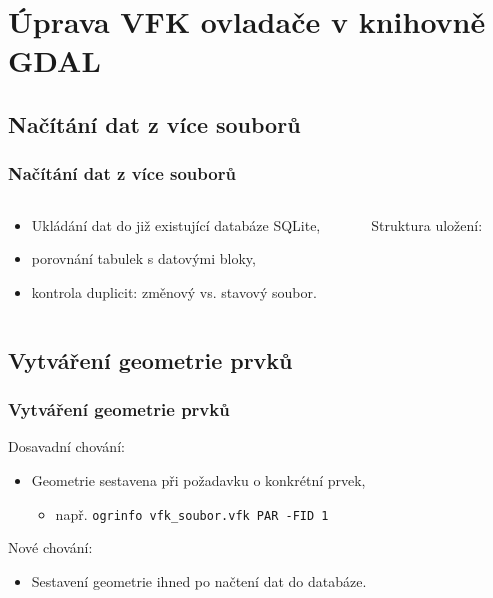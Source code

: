 \documentclass{beamer}
\begin{document}

\section{Úprava VFK ovladače v knihovně GDAL}

\subsection{Načítání dat z více souborů}

\begin{frame}
\frametitle{Načítání dat z více souborů}

\begin{columns}%
  \begin{column}{0.5\textwidth}
  
    \begin{itemize}
     \item Ukládání dat do již existující databáze SQLite,
     \item porovnání tabulek s datovými bloky,
     \item kontrola duplicit: změnový vs. stavový soubor.
    \end{itemize}
    
  \end{column}
  
  \begin{column}{0.4\textwidth}
  Struktura uložení:
  \end{column}

\end{columns}
  
\end{frame}


\subsection{Vytváření geometrie prvků}

\begin{frame}
\frametitle{Vytváření geometrie prvků}

Dosavadní chování:
\begin{itemize}
 \item Geometrie sestavena při požadavku o konkrétní prvek,
  \begin{itemize}
   \item např. \texttt{ogrinfo vfk\_soubor.vfk PAR -FID 1}
  \end{itemize}
\end{itemize}

Nové chování:
\begin{itemize}
 \item Sestavení geometrie ihned po načtení dat do databáze.
\end{itemize}

\end{frame}
\end{document}
